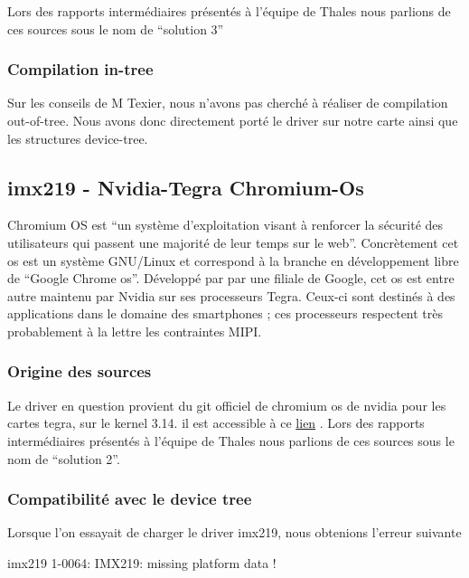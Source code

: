 {Lors des rapports intermédiaires présentés à l’équipe de Thales nous parlions de ces
sources sous le nom de “solution 3”

\subsubsection{Compilation in-tree}

Sur les conseils de M Texier, nous n’avons pas cherché à réaliser de compilation
out-of-tree. Nous avons donc directement porté le driver sur notre carte ainsi que les
structures device-tree.

\subsection{imx219 - Nvidia-Tegra Chromium-Os}

Chromium OS est “un système d’exploitation visant à renforcer la sécurité des utilisateurs qui
passent une majorité de leur temps sur le web”. Concrètement cet os est un système GNU/Linux et
correspond à la branche en développement libre de “Google Chrome os”. Développé par par une filiale
de Google, cet os est entre autre maintenu par Nvidia sur ses processeurs Tegra. Ceux-ci
sont destinés à des applications dans le domaine des smartphones ; ces processeurs
respectent très probablement à la lettre les contraintes MIPI.

\subsubsection{Origine des sources}

Le driver en question provient du git officiel de chromium os de nvidia pour les cartes
tegra, sur le kernel 3.14. il est accessible à ce
\href{https://chromium.googlesource.com/chromiumos/third_party/kernel/+/factory-ryu-6486.14.B-chromeos-3.14/drivers/media/}{lien} .
Lors des rapports intermédiaires présentés à l’équipe de Thales nous parlions de ces
sources sous le nom de “solution 2”.

\subsubsection{Compatibilité avec le device tree}

Lorsque l’on essayait de charger le driver imx219, nous obtenions l’erreur suivante

\begin{tcolorbox}
    imx219 1-0064: IMX219: missing platform data !
\end{tcolorbox}

}
